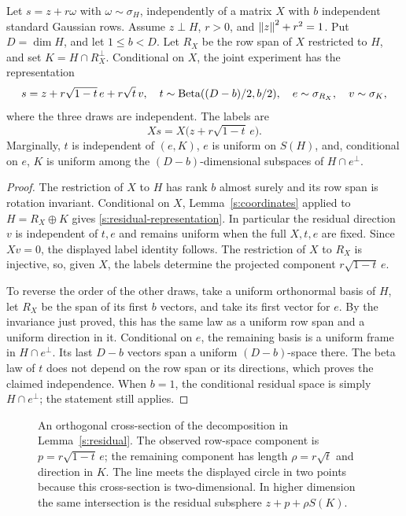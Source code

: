 \begin{lemma}\label{s:residual}
Let \(s=z+r\omega\) with \(\omega\sim\sigma_H\), independently of
a matrix \(X\) with \(b\) independent standard Gaussian rows. Assume
\(z\perp H\), \(r>0\), and \(\left\lVert z\right\rVert^2+r^2=1\).
Put \(D=\dim H\), and let \(1\le b<D\).
Let \(R_X\) be the row span of \(X\) restricted to \(H\), and set
\(K=H\cap R_X^\perp\). Conditional on \(X\), the joint experiment has
the representation
\begin{equation}\label{s:residual-representation}
 s=z+r\sqrt{1-t}\,e+r\sqrt t\,v,
 \quad
 t\sim\operatorname{Beta}((D-b)/2,b/2),\quad
 e\sim\sigma_{R_X},\quad v\sim\sigma_K,
\end{equation}
where the three draws are independent. The labels are
\[
 Xs=X\bigl(z+r\sqrt{1-t}\,e\bigr).
\]
Marginally, \(t\) is independent of \((e,K)\), \(e\) is uniform on
\(S(H)\), and, conditional on \(e\), \(K\) is uniform among the
\((D-b)\)-dimensional subspaces of \(H\cap e^\perp\).
\end{lemma}
\begin{proof}
The restriction of \(X\) to \(H\) has rank \(b\) almost surely and
its row span is rotation invariant. Conditional on \(X\),
Lemma~\ref{s:coordinates} applied to \(H=R_X\oplus K\) gives
\eqref{s:residual-representation}. In particular the residual
direction \(v\) is independent of \(t,e\) and remains uniform when
the full \(X,t,e\) are fixed. Since \(Xv=0\), the displayed label
identity follows. The restriction of \(X\) to \(R_X\) is injective,
so, given \(X\), the labels determine the projected component
\(r\sqrt{1-t}\,e\).

To reverse the order of the other draws, take a uniform orthonormal
basis of \(H\), let \(R_X\) be the span of its first \(b\) vectors,
and take its first vector for \(e\). By the invariance just proved,
this has the same law as a uniform row span and a uniform direction
in it. Conditional on \(e\), the remaining basis is a uniform frame
in \(H\cap e^\perp\). Its last \(D-b\) vectors span a uniform
\((D-b)\)-space there. The beta law of \(t\) does not depend on the
row span or its directions, which proves the claimed independence.
When \(b=1\), the conditional residual space is simply
\(H\cap e^\perp\); the statement still applies.
\end{proof}

\begin{figure}[H]
\centering

\caption{An orthogonal cross-section of the decomposition in
Lemma~\ref{s:residual}. The observed row-space component is
\(p=r\sqrt{1-t}\,e\); the remaining component has length
\(\rho=r\sqrt t\) and direction in \(K\).
The line meets the displayed circle in two points because this
cross-section is two-dimensional. In higher dimension the same
intersection is the residual subsphere \(z+p+\rho S(K)\).}
\label{s:residual-figure}
\end{figure}

